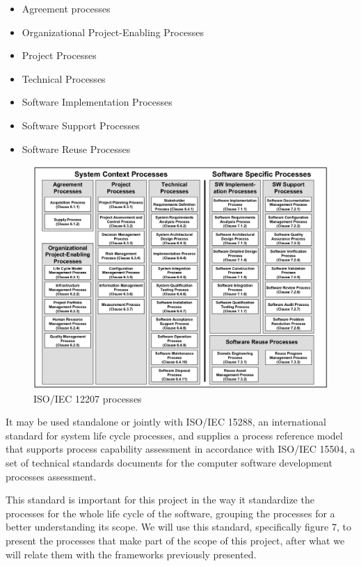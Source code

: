 \begin{itemize}
  \item Agreement processes
  \item Organizational Project-Enabling Processes
  \item Project Processes
  \item Technical Processes
  \item Software Implementation Processes
  \item Software Support Processes
  \item Software Reuse Processes 
\end{itemize}

 
\begin{figure}[t!]
\centering
\includegraphics[width=\textwidth]{img/ISO12207Processes.png}
\caption{ISO/IEC 12207 processes}
\end{figure}

It may be used standalone or jointly with ISO/IEC 15288\cite{ISO15288}, an international standard for system life cycle processes, and supplies a process reference model that supports process capability assessment in accordance with ISO/IEC 15504\cite{ISO15504}, a set of technical standards documents for the computer software development processes assessment.\par
This standard is important for this project in the way it standardize the processes for the whole life cycle of the software, grouping the processes for a better understanding its scope. We will use this standard, specifically figure 7, to present the processes that make part of the scope of this project, after what we will relate them with the frameworks previously presented. 


